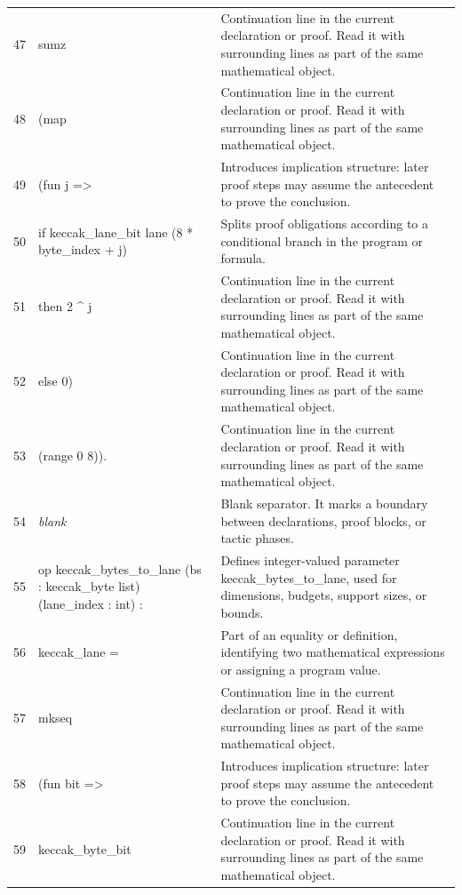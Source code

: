 \documentclass[10pt]{article}
\begin{document}
\begin{longtable}{r L{0.53\textwidth} L{0.37\textwidth}}
47 & {\ttfamily\scriptsize   sumz} & Continuation line in the current declaration or proof.  Read it with surrounding lines as part of the same mathematical object. \\
48 & {\ttfamily\scriptsize     (map} & Continuation line in the current declaration or proof.  Read it with surrounding lines as part of the same mathematical object. \\
49 & {\ttfamily\scriptsize       (fun j =>} & Introduces implication structure: later proof steps may assume the antecedent to prove the conclusion. \\
50 & {\ttfamily\scriptsize          if keccak\_lane\_bit lane (8 * byte\_index + j)} & Splits proof obligations according to a conditional branch in the program or formula. \\
51 & {\ttfamily\scriptsize          then 2 \textasciicircum{} j} & Continuation line in the current declaration or proof.  Read it with surrounding lines as part of the same mathematical object. \\
52 & {\ttfamily\scriptsize          else 0)} & Continuation line in the current declaration or proof.  Read it with surrounding lines as part of the same mathematical object. \\
53 & {\ttfamily\scriptsize       (range 0 8)).} & Continuation line in the current declaration or proof.  Read it with surrounding lines as part of the same mathematical object. \\
54 & {\ttfamily\scriptsize \emph{blank}} & Blank separator.  It marks a boundary between declarations, proof blocks, or tactic phases. \\
55 & {\ttfamily\scriptsize op keccak\_bytes\_to\_lane (bs : keccak\_byte list) (lane\_index : int) :} & Defines integer-valued parameter keccak\_bytes\_to\_lane, used for dimensions, budgets, support sizes, or bounds. \\
56 & {\ttfamily\scriptsize   keccak\_lane =} & Part of an equality or definition, identifying two mathematical expressions or assigning a program value. \\
57 & {\ttfamily\scriptsize   mkseq} & Continuation line in the current declaration or proof.  Read it with surrounding lines as part of the same mathematical object. \\
58 & {\ttfamily\scriptsize     (fun bit =>} & Introduces implication structure: later proof steps may assume the antecedent to prove the conclusion. \\
59 & {\ttfamily\scriptsize        keccak\_byte\_bit} & Continuation line in the current declaration or proof.  Read it with surrounding lines as part of the same mathematical object. \\

\end{longtable}
\end{document}
